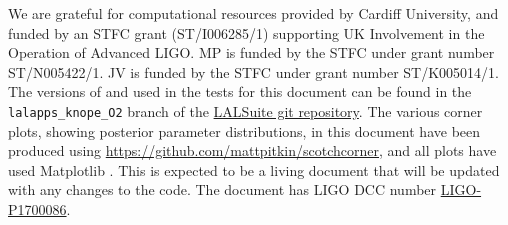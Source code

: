 \acknowledgements

We are grateful for computational resources provided by Cardiff University, and funded by an STFC grant (ST/I006285/1) supporting UK Involvement in
the Operation of Advanced LIGO. MP is funded by the STFC under grant number ST/N005422/1. JV is funded by the STFC under grant number ST/K005014/1. The versions of \lppenf and \lppef used in the tests for this document
can be found in the {\tt lalapps\_knope\_O2} branch of the \href{https://github.com/lscsoft/lalsuite/tree/lalapps_knope_O2}{LALSuite git repository}. The various
corner plots, showing posterior parameter distributions, in this document have been produced using \url{https://github.com/mattpitkin/scotchcorner}, and all
plots have used Matplotlib \citet{Hunter:2007,michael_droettboom_2017_248351}.
This is expected
to be a living document that will be updated with any changes to the code. The document has LIGO DCC number \href{https://dcc.ligo.org/P1700086}{LIGO-P1700086}.
